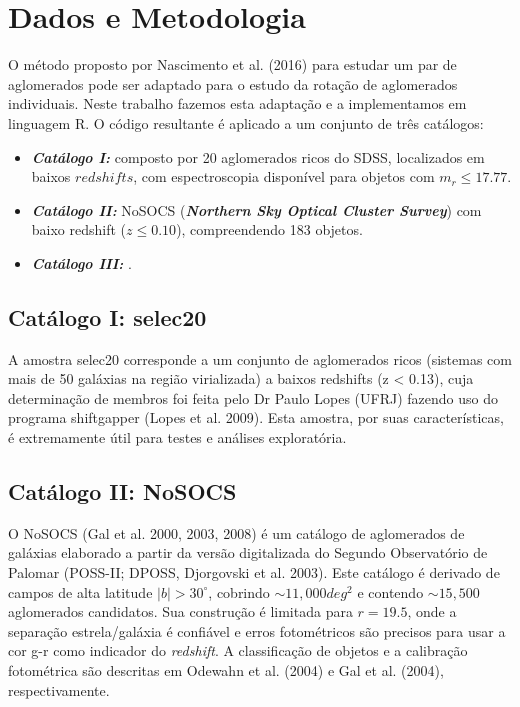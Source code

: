 \chapter{Dados e Metodologia}

O método proposto por Nascimento et al. (2016) para estudar um par de aglomerados pode ser adaptado para o estudo da rotação de aglomerados individuais. Neste trabalho fazemos esta adaptação e a implementamos em linguagem R. O código resultante é aplicado a um conjunto de três catálogos: 

\begin{itemize}
   \item \textit{\textbf{Catálogo I: }} composto por 20 aglomerados ricos do SDSS, localizados em baixos $redshifts$, com espectroscopia disponível para objetos com $m_r \leq 17.77$.
   \item \textit{\textbf{Catálogo II: }} NoSOCS (\textit{\textbf{Northern Sky Optical Cluster Survey}}) com baixo redshift ($z \leq 0.10$), compreendendo 183 objetos.	
   \item \textit{\textbf{Catálogo III: }} .
 \end{itemize}  

\section{Catálogo I: selec20}
A amostra selec20  corresponde a um conjunto de aglomerados ricos (sistemas com mais de 50 galáxias na região virializada) a baixos redshifts (z < 0.13), cuja determinação de membros foi feita pelo Dr Paulo Lopes (UFRJ) fazendo uso do programa shiftgapper (Lopes et al. 2009). Esta amostra, por suas características, é  extremamente útil para testes e análises exploratória. 


\section{Catálogo II: NoSOCS}
\label{subsec:simulate}

O NoSOCS (Gal et al. 2000, 2003, 2008) é um catálogo de aglomerados de galáxias elaborado a partir da versão digitalizada do Segundo Observatório de Palomar (POSS-II; DPOSS, Djorgovski et al. 2003). Este catálogo é derivado de campos de alta latitude $\vert b \vert > 30^\circ$, cobrindo $ \sim 11,000  deg^2$ e contendo $\sim 15,500$ aglomerados candidatos. Sua construção é limitada para $r = 19.5$, onde a separação estrela/galáxia é confiável e erros fotométricos são precisos para usar a cor g-r como indicador do \textit{redshift}. A classificação de objetos e a calibração fotométrica são descritas em Odewahn et al. (2004) e Gal et al. (2004), respectivamente.

